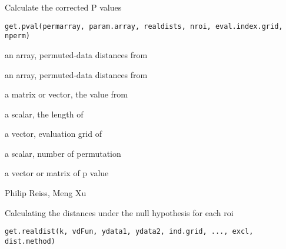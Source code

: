\documentclass[a4paper]{book}
\begin{document}
%
\begin{Description}\relax
Calculate the corrected P values
\end{Description}
%
\begin{Usage}
\begin{verbatim}
get.pval(permarray, param.array, realdists, nroi, eval.index.grid, nperm)
\end{verbatim}
\end{Usage}
%
\begin{Arguments}
\begin{ldescription}
\item[\code{permarray}] an array, permuted-data distances from 

\item[\code{param.array}] an array, permuted-data distances from 

\item[\code{realdists}] a matrix or vector, the value from 

\item[\code{nroi}] a scalar, the length of 

\item[\code{eval.index.grid}] a vector, evaluation grid of 

\item[\code{nperm}] a scalar, number of permutation
\end{ldescription}
\end{Arguments}
%
\begin{Value}
a vector or matrix of p value
\end{Value}
%
\begin{Author}\relax
Philip Reiss, Meng Xu
\end{Author}
%
\begin{SeeAlso}\relax
{}
\end{SeeAlso}
%
\begin{Description}\relax
Calculating the distances under the null hypothesis for each roi
\end{Description}
%
\begin{Usage}
\begin{verbatim}
get.realdist(k, vdFun, ydata1, ydata2, ind.grid, ..., excl, dist.method)
\end{verbatim}
\end{Usage}
%
\end{document}
